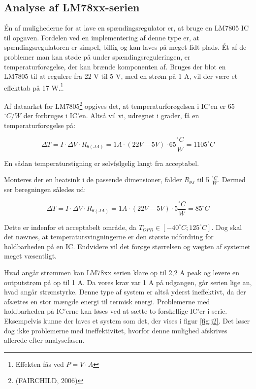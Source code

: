 \subsection{Analyse af LM78xx-serien}
\label{sec:analyse-af-lm78xx}

Én af mulighederne for at lave en spændingsregulator er, at bruge en LM7805 IC til opgaven. Fordelen ved en implementering af denne type er, at spændingsregulatoren er simpel, billig og kan laves på meget lidt plads. Ét af de problemer man kan støde på under spændingsreguleringen, er temperaturforøgelse, der kan brænde komponenten af. Bruges der blot en LM7805 til at regulere fra 22 V til 5 V, med en strøm på 1 A, vil der være et effekttab på 17 W.\footnote{Effekten fås ved $P=V\cdot A$}

Af dataarket for LM7805\footnote{(FAIRCHILD, 2006)} opgives det, at temperaturforøgelsen i IC’en er 65 $^\circ C/W$ der forbruges i IC’en. Altså vil vi, udregnet i grader, få en temperaturforøgelse på:

\begin{equation}
  \label{eq:3}
  \Delta T = I \cdot \Delta V \cdot R_{\theta (JA)}=1 A \cdot (22V-5V)\cdot 65 \frac{^\circ C}{W} = 1105^\circ C
\end{equation}

En sådan temperaturstigning er selvfølgelig langt fra acceptabel.

Monteres der en heatsink i de passende dimensioner, falder $R_{\theta J}$ til 5 $\frac{^\circ C}{W}$. Dermed ser beregningen således ud: 

\begin{equation}
  \label{eq:3}
  \Delta T = I \cdot \Delta V \cdot R_{\theta (JA)}=1 A \cdot (22V-5V)\cdot 5 \frac{^\circ C}{W} = 85^\circ C
\end{equation}

Dette er indenfor et acceptabelt område, da $T_{OPR} \in  [-40 ^\circ C;125 ^\circ C]$. Dog skal det nævnes, at temperatursvingningerne er den største udfordring for holdbarheden på en IC. Endvidere vil det forøge størrelsen og vægten af systemet meget væsentligt.

Hvad angår strømmen kan LM78xx serien klare op til 2,2 A peak og levere en outputstrøm på op til 1 A. Da vores krav var 1 A på udgangen, går serien lige an, hvad angår strømstyrke. Denne type af system er altså yderst ineffektivt, da der afsættes en stor mængde energi til termisk energi. Problemerne med holdbarheden på IC’erne kan løses ved at sætte to forskellige IC’er i serie. Eksempelvis kunne der laves et system som det, der vises i figur \ref{fig:j2}. Det løser dog ikke problemerne med ineffektivitet, hvorfor denne mulighed afskrives allerede efter analysefasen.

